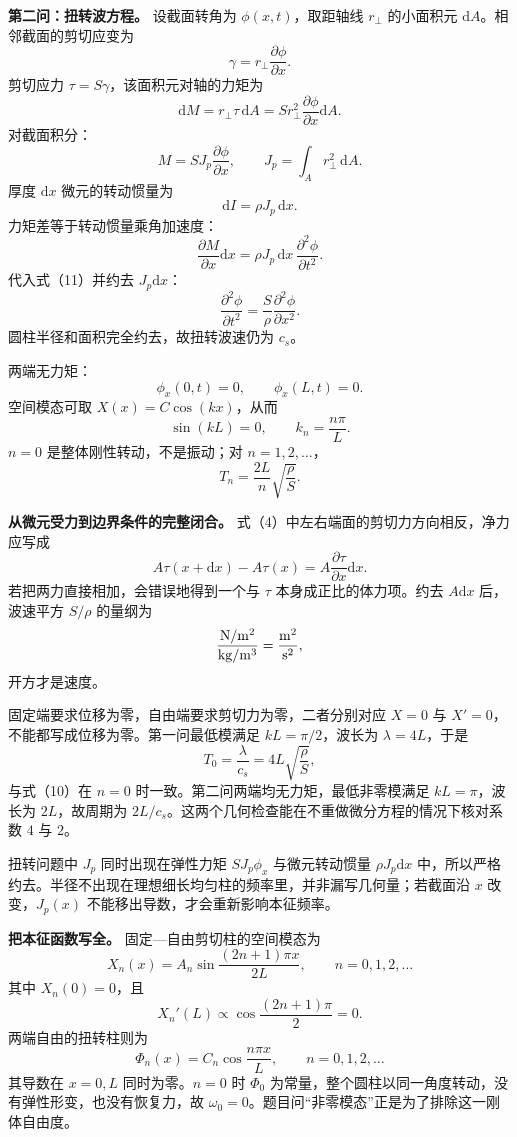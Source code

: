 \documentclass[12pt,a4paper,UTF8]{ctexart}
\begin{document}
\textbf{第二问：扭转波方程。} 设截面转角为 \(\phi(x,t)\)，取距轴线
\(r_\perp\) 的小面积元 \(\mathrm dA\)。相邻截面的剪切应变为 \[
\gamma=r_\perp\frac{\partial\phi}{\partial x}.
\] 剪切应力 \(\tau=S\gamma\)，该面积元对轴的力矩为 \[
\mathrm dM=r_\perp\tau\,\mathrm dA
=S r_\perp^2\frac{\partial\phi}{\partial x}\mathrm dA.
\] 对截面积分： \[
M=S J_p\frac{\partial\phi}{\partial x},\qquad
J_p=\int_A r_\perp^2\,\mathrm dA. \tag{11}
\] 厚度 \(\mathrm dx\) 微元的转动惯量为 \[
\mathrm dI=\rho J_p\,\mathrm dx. \tag{12}
\] 力矩差等于转动惯量乘角加速度： \[
\frac{\partial M}{\partial x}\mathrm dx
=\rho J_p\,\mathrm dx\,
\frac{\partial^2\phi}{\partial t^2}.
\] 代入式（11）并约去 \(J_p\mathrm dx\)： \[
\frac{\partial^2\phi}{\partial t^2}
=\frac S\rho\frac{\partial^2\phi}{\partial x^2}. \tag{13}
\] 圆柱半径和面积完全约去，故扭转波速仍为 \(c_s\)。

两端无力矩： \[
\phi_x(0,t)=0,\qquad \phi_x(L,t)=0.
\] 空间模态可取 \(X(x)=C\cos(kx)\)，从而 \[
\sin(kL)=0,\qquad k_n=\frac{n\pi}{L}.
\] \(n=0\) 是整体刚性转动，不是振动；对 \(n=1,2,\ldots\)， \[
\boxed{
T_n=\frac{2L}{n}\sqrt{\frac\rho S}
}. \tag{14}
\]

\textbf{从微元受力到边界条件的完整闭合。}
式（4）中左右端面的剪切力方向相反，净力应写成 \[
A\tau(x+\mathrm dx)-A\tau(x)
=A\frac{\partial\tau}{\partial x}\mathrm dx.
\] 若把两力直接相加，会错误地得到一个与 \(\tau\)
本身成正比的体力项。约去 \(A\mathrm dx\) 后，波速平方 \(S/\rho\)
的量纲为 \[
\frac{{\rm N/m^2}}{{\rm kg/m^3}}
=\frac{{\rm m^2}}{{\rm s^2}},
\] 开方才是速度。

固定端要求位移为零，自由端要求剪切力为零，二者分别对应 \(X=0\) 与
\(X'=0\)，不能都写成位移为零。第一问最低模满足 \(kL=\pi/2\)，波长为
\(\lambda=4L\)，于是 \[
T_0=\frac{\lambda}{c_s}=4L\sqrt{\frac\rho S},
\] 与式（10）在 \(n=0\) 时一致。第二问两端均无力矩，最低非零模满足
\(kL=\pi\)，波长为 \(2L\)，故周期为
\(2L/c_s\)。这两个几何检查能在不重做微分方程的情况下核对系数 \(4\) 与
\(2\)。

扭转问题中 \(J_p\) 同时出现在弹性力矩 \(SJ_p\phi_x\) 与微元转动惯量
\(\rho J_p\mathrm dx\)
中，所以严格约去。半径不出现在理想细长均匀柱的频率里，并非漏写几何量；若截面沿
\(x\) 改变，\(J_p(x)\) 不能移出导数，才会重新影响本征频率。

\textbf{把本征函数写全。} 固定---自由剪切柱的空间模态为 \[
X_n(x)=A_n\sin\frac{(2n+1)\pi x}{2L},
\qquad n=0,1,2,\ldots
\] 其中 \(X_n(0)=0\)，且 \[
X_n'(L)\propto
\cos\frac{(2n+1)\pi}{2}=0.
\] 两端自由的扭转柱则为 \[
\Phi_n(x)=C_n\cos\frac{n\pi x}{L},
\qquad n=0,1,2,\ldots
\] 其导数在 \(x=0,L\) 同时为零。\(n=0\) 时 \(\Phi_0\)
为常量，整个圆柱以同一角度转动，没有弹性形变，也没有恢复力，故
\(\omega_0=0\)。题目问``非零模态''正是为了排除这一刚体自由度。
\end{document}
